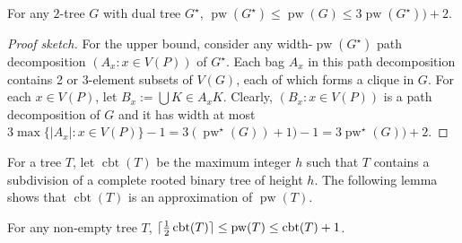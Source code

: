 \documentclass[kpfonts]{patmorin}
\DeclareMathOperator{\pw}{pw}
\DeclareMathOperator{\sh}{cbt}
\begin{document}
\begin{lem}\label{dual_approx}
    For any $2$-tree $G$ with dual tree $G^\star$, $\pw(G^\star) \le \pw(G) \le 3\pw(G^\star)) + 2$.
\end{lem}

\begin{proof}[Proof sketch]
    For the upper bound, consider any width-$\pw(G^\star)$ path decomposition $(A_x:x\in V(P))$ of $G^\star$. Each bag $A_x$ in this path decomposition contains 2 or 3-element subsets of $V(G)$, each of which forms a clique in $G$.  For each $x\in V(P)$, let $B_x:=\bigcup{K\in A_x}K$.  Clearly, $(B_x:x\in V(P))$ is a path decomposition of $G$ and it has width at most $3\max\{|A_x|:x\in V(P)\}-1=3(\pw^\star(G))+1)-1=3\pw^\star(G)) + 2$.

\end{proof}

For a tree $T$, let $\sh(T)$ be the maximum integer $h$ such that $T$ contains a subdivision of a complete rooted binary tree of height $h$.
%
%
The following lemma shows that $\sh(T)$ is an approximation of $\pw(T)$.

\begin{lem}\label{b_approx}
    For any non-empty tree $T$, $\ceil{\tfrac{1}{2}\sh(T)} \le \pw(T) \le \sh(T)+1$.
\end{lem}
\end{document}
